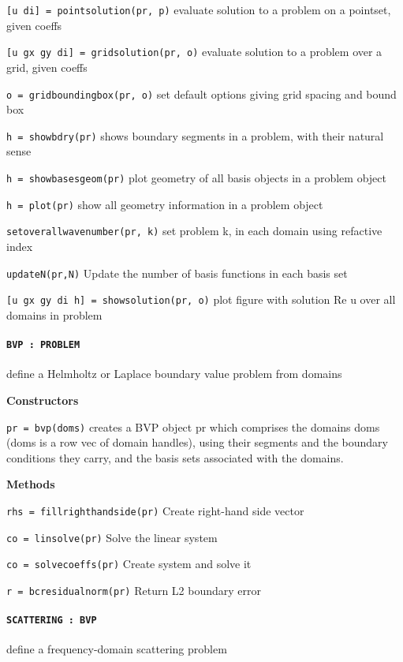 {\tt [u di] = pointsolution(pr, p)} evaluate solution to a problem on
a pointset, given coeffs

{\tt [u gx gy di] = gridsolution(pr, o)} evaluate solution to a
problem over a grid, given coeffs

{\tt o = gridboundingbox(pr, o)} set default options giving grid spacing
and bound box

{\tt h = showbdry(pr)} shows boundary segments in a problem, with
their natural sense

{\tt h = showbasesgeom(pr)} plot geometry of all basis objects in a problem object

{\tt h = plot(pr)} show all geometry information in a problem object

{\tt setoverallwavenumber(pr, k)} set problem k, in each domain using
refactive index

{\tt updateN(pr,N)} Update the number of basis functions in each basis set

{\tt [u gx gy di h] = showsolution(pr, o)} plot figure with solution Re u
over all domains in problem

\newpage

\paragraph{\tt BVP : PROBLEM} define a Helmholtz or Laplace boundary
value problem from domains

\textbf{Constructors}

{\tt pr = bvp(doms)} creates a BVP object pr which comprises the
domains doms (doms is a row vec of domain handles), using their segments and the
   boundary conditions they carry, and the basis sets associated with the
   domains.

\textbf{Methods}

{\tt rhs = fillrighthandside(pr)} Create right-hand side vector

{\tt co = linsolve(pr)} Solve the linear system

{\tt co = solvecoeffs(pr)} Create system and solve it

{\tt r = bcresidualnorm(pr)} Return L2 boundary error

\newpage

\paragraph{\tt SCATTERING : BVP} define a frequency-domain scattering problem

